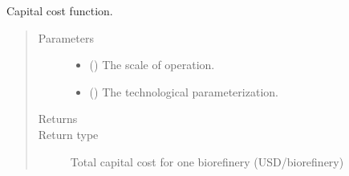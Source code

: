 \documentclass[letterpaper,10pt,english]{sphinxmanual}
\begin{document}
\begin{fulllineitems}
\label{\detokenize{doc-src/technology:technology.biorefinery_v1.capital_cost}}
Capital cost function.
\begin{quote}\begin{description}
\item[{Parameters}] \leavevmode\begin{itemize}
\item {} 
 () \textendash{} The scale of operation.

\item {} 
 () \textendash{} The technological parameterization.

\end{itemize}

\item[{Returns}] \leavevmode


\item[{Return type}] \leavevmode
Total capital cost for one biorefinery (USD/biorefinery)

\end{description}\end{quote}

\end{fulllineitems}

\end{document}
